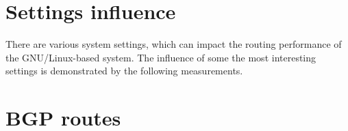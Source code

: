 	
	
	

	

	

	

\section{Settings influence}
There are various system settings, which can impact the routing performance of the GNU/Linux-based system.
The influence of some the most interesting settings is demonstrated by the following measurements.

	

	

	

	

	

	

\section{BGP routes}

	

